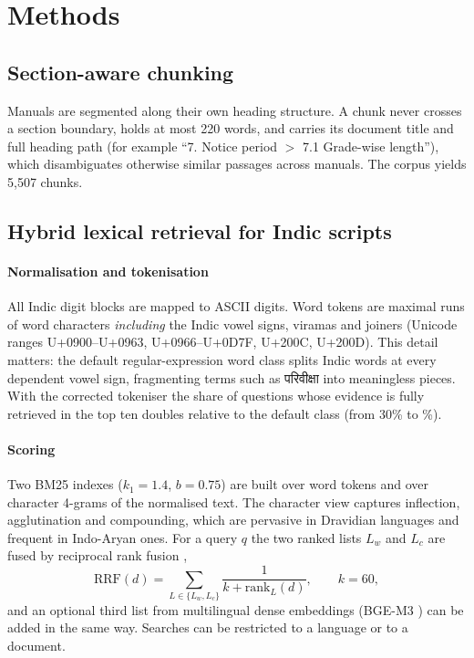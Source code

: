 \documentclass[preprint,12pt]{elsarticle}
\begin{document}
\section{Methods}
\label{sec:method}

\subsection{Section-aware chunking}
Manuals are segmented along their own heading structure. A chunk never crosses a section boundary, holds at most 220 words, and carries its document title and full heading path (for example ``7. Notice period $>$ 7.1 Grade-wise length''), which disambiguates otherwise similar passages across manuals. The corpus yields 5,507 chunks.

\subsection{Hybrid lexical retrieval for Indic scripts}
\paragraph{Normalisation and tokenisation} All Indic digit blocks are mapped to ASCII digits. Word tokens are maximal runs of word characters \emph{including} the Indic vowel signs, viramas and joiners (Unicode ranges U+0900--U+0963, U+0966--U+0D7F, U+200C, U+200D). This detail matters: the default regular-expression word class splits Indic words at every dependent vowel sign, fragmenting terms such as {\devanagari परिवीक्षा} into meaningless pieces. With the corrected tokeniser the share of questions whose evidence is fully retrieved in the top ten doubles relative to the default class (from 30\% to \RAllTen\%).

\paragraph{Scoring} Two BM25 indexes \cite{robertson2009bm25} ($k_1=1.4$, $b=0.75$) are built over word tokens and over character 4-grams of the normalised text. The character view captures inflection, agglutination and compounding, which are pervasive in Dravidian languages and frequent in Indo-Aryan ones. For a query $q$ the two ranked lists $L_w$ and $L_c$ are fused by reciprocal rank fusion \cite{cormack2009rrf},
\begin{equation}
\mathrm{RRF}(d)=\sum_{L\in\{L_w,L_c\}} \frac{1}{k+\mathrm{rank}_L(d)},\qquad k=60,
\end{equation}
and an optional third list from multilingual dense embeddings (BGE-M3 \cite{chen2024bgem3}) can be added in the same way. Searches can be restricted to a language or to a document.
\end{document}
